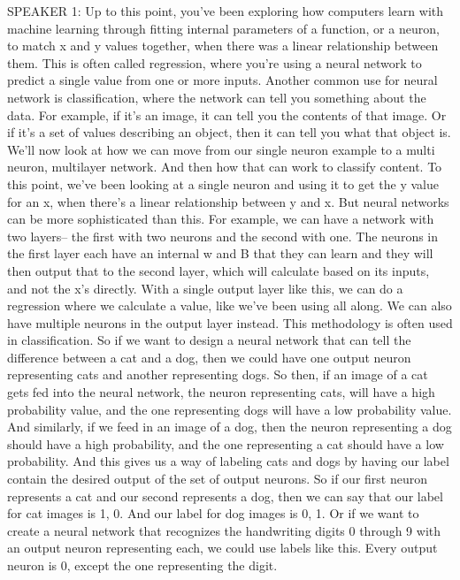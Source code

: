 SPEAKER 1: Up to this point, you've been exploring
how computers learn with machine learning
through fitting internal parameters of a function, or a neuron,
to match x and y values together, when there
was a linear relationship between them.
This is often called regression, where you're
using a neural network to predict a single value from one or more inputs.
Another common use for neural network is classification, where the network
can tell you something about the data.
For example, if it's an image, it can tell you the contents of that image.
Or if it's a set of values describing an object,
then it can tell you what that object is.
We'll now look at how we can move from our single neuron example
to a multi neuron, multilayer network.
And then how that can work to classify content.
To this point, we've been looking at a single neuron
and using it to get the y value for an x, when there's
a linear relationship between y and x.
But neural networks can be more sophisticated than this.
For example, we can have a network with two layers--
the first with two neurons and the second with one.
The neurons in the first layer each have an internal w and B that they can learn
and they will then output that to the second layer, which
will calculate based on its inputs, and not the x's directly.
With a single output layer like this, we can do a regression
where we calculate a value, like we've been using all along.
We can also have multiple neurons in the output layer instead.
This methodology is often used in classification.
So if we want to design a neural network that
can tell the difference between a cat and a dog,
then we could have one output neuron representing cats
and another representing dogs.
So then, if an image of a cat gets fed into the neural network, the neuron
representing cats, will have a high probability value,
and the one representing dogs will have a low probability value.
And similarly, if we feed in an image of a dog,
then the neuron representing a dog should have a high probability,
and the one representing a cat should have a low probability.
And this gives us a way of labeling cats and dogs
by having our label contain the desired output of the set of output neurons.
So if our first neuron represents a cat and our second represents a dog,
then we can say that our label for cat images is 1, 0.
And our label for dog images is 0, 1.
Or if we want to create a neural network that recognizes the handwriting
digits 0 through 9 with an output neuron representing each,
we could use labels like this.
Every output neuron is 0, except the one representing the digit.
